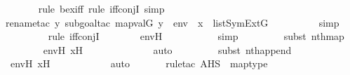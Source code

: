 \begin{isabellebody}
\ \ \ \ \ \ \isamarkupfalse%
{\isacharparenleft}{\kern0pt}rule\ bex{\isacharunderscore}{\kern0pt}iff{\isacharcomma}{\kern0pt}\ rule\ iff{\isacharunderscore}{\kern0pt}conjI{}{\isacharcomma}{\kern0pt}\ simp{\isacharparenright}{\kern0pt}\isanewline
\ \ \ \ \ \ \isamarkupfalse%
{\isacharparenleft}{\kern0pt}rename{\isacharunderscore}{\kern0pt}tac\ y{\isacharprime}{\kern0pt}{\isacharcomma}{\kern0pt}\ subgoal{\isacharunderscore}{\kern0pt}tac\ {\isachardoublequoteopen}map{\isacharparenleft}{\kern0pt}val{\isacharparenleft}{\kern0pt}G{\isacharparenright}{\kern0pt}{\isacharcomma}{\kern0pt}\ {\isacharbrackleft}{\kern0pt}y{\isacharprime}{\kern0pt}{\isacharbrackright}{\kern0pt}\ {\isacharat}{\kern0pt}\ env{\isacharprime}{\kern0pt}\ {\isacharat}{\kern0pt}\ {\isacharbrackleft}{\kern0pt}x{\isacharprime}{\kern0pt}{\isacharbrackright}{\kern0pt}{\isacharparenright}{\kern0pt}\ {\isasymin}\ list{\isacharparenleft}{\kern0pt}SymExt{\isacharparenleft}{\kern0pt}G{\isacharparenright}{\kern0pt}{\isacharparenright}{\kern0pt}{\isachardoublequoteclose}{\isacharparenright}{\kern0pt}\ \isanewline
\ \ \ \ \ \ \ \isamarkupfalse%
\ simp\isanewline
\ \ \ \ \ \ \ \isamarkupfalse%
\ {\isacharparenleft}{\kern0pt}rule\ iff{\isacharunderscore}{\kern0pt}conjI{}{\isacharparenright}{\kern0pt}\isanewline
\ \ \ \ \ \ \isamarkupfalse%
\ env{\isacharprime}{\kern0pt}H\ \isanewline
\ \ \ \ \ \ \ \ \isamarkupfalse%
\ simp\isanewline
\ \ \ \ \ \ \ \ \isamarkupfalse%
{\isacharparenleft}{\kern0pt}subst\ nth{\isacharunderscore}{\kern0pt}map{\isacharparenright}{\kern0pt}\isanewline
\ \ \ \ \ \ \isamarkupfalse%
\ env{\isacharprime}{\kern0pt}H\ x{\isacharprime}{\kern0pt}H\ \isanewline
\ \ \ \ \ \ \ \ \ \ \ \isamarkupfalse%
\ auto{\isacharbrackleft}{\kern0pt}{}{\isacharbrackright}{\kern0pt}\isanewline
\ \ \ \ \ \ \ \ \isamarkupfalse%
{\isacharparenleft}{\kern0pt}subst\ nth{\isacharunderscore}{\kern0pt}append{\isacharparenright}{\kern0pt}\isanewline
\ \ \ \ \ \ \isamarkupfalse%
\ env{\isacharprime}{\kern0pt}H\ x{\isacharprime}{\kern0pt}H\isanewline
\ \ \ \ \ \ \ \ \ \ \isamarkupfalse%
\ auto{\isacharbrackleft}{\kern0pt}{}{\isacharbrackright}{\kern0pt}\isanewline
\ \ \ \ \ \ \isamarkupfalse%
{\isacharparenleft}{\kern0pt}rule{\isacharunderscore}{\kern0pt}tac\ A{\isacharequal}{\kern0pt}HS\ \ map{\isacharunderscore}{\kern0pt}type{\isacharparenright}{\kern0pt}\isanewline

\end{isabellebody}
